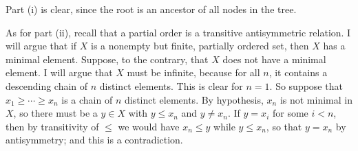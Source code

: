 \documentclass[
]{article}
\begin{document}
Part (i) is clear, since the root is an ancestor of all nodes in the tree. 


As for part (ii), recall that a partial order is a transitive antisymmetric relation.  I will argue that if $X$ is a nonempty but finite, partially ordered set, then $X$ has a minimal element.  Suppose, to the contrary, that $X$ does not have a minimal element.  I will argue that $X$ must be infinite, because for all $n$, it contains a descending chain of $n$ distinct elements.  This is clear for $n=1$.  So suppose that $x_1\geq\cdots\geq x_n$ is a chain of $n$ distinct elements.  By hypothesis, $x_n$ is not minimal in $X$, so there must be a $y\in X$ with $y\leq x_n$ and $y\neq x_n$.  If $y=x_i$ for some $i<n$, then by transitivity of $\leq$ we would have $x_n\leq y$ while $y\leq x_n$, so that $y=x_n$ by antisymmetry; and this is a contradiction.

\end{document}
